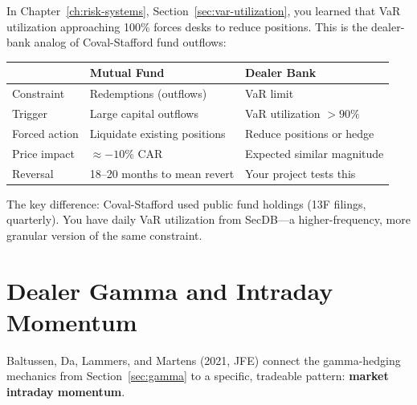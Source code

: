 \begin{keyidea}
In Chapter~\ref{ch:risk-systems}, Section~\ref{sec:var-utilization},
you learned that VaR utilization approaching 100\% forces desks to
reduce positions.  This is the dealer-bank analog of Coval-Stafford
fund outflows:

\begin{center}
\small
\begin{tabular}{@{}lll@{}}
\toprule
 & \textbf{Mutual Fund} & \textbf{Dealer Bank} \\
\midrule
Constraint & Redemptions (outflows) & VaR limit \\
Trigger & Large capital outflows & VaR utilization $> 90\%$ \\
Forced action & Liquidate existing positions & Reduce positions
  or hedge \\
Price impact & $\approx -10\%$ CAR & Expected similar magnitude \\
Reversal & 18--20 months to mean revert & Your project tests this \\
\bottomrule
\end{tabular}
\end{center}

The key difference: Coval-Stafford used public fund holdings
(13F filings, quarterly).  You have daily VaR utilization from
SecDB---a higher-frequency, more granular version of the same
constraint.
\end{keyidea}


\section{Dealer Gamma and Intraday Momentum}
\label{sec:intraday-momentum}

Baltussen, Da, Lammers, and Martens (2021, JFE) connect the
gamma-hedging mechanics from Section~\ref{sec:gamma} to a
specific, tradeable pattern: \textbf{market intraday momentum}.


